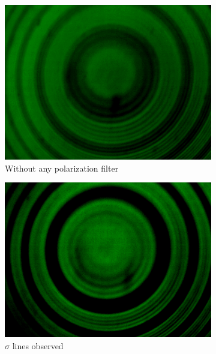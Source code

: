 \begin{figure}
    \centering
    \begin{subfigure}[b]{0.45\textwidth}
        \centering
        \includegraphics[width=\textwidth]{images/ano4.png}
        \caption{Without any polarization filter}
    \end{subfigure}
    \hfill
    \begin{subfigure}[b]{0.45\textwidth}
        \centering
        \includegraphics[width=\textwidth]{images/sigma.png}
        \caption{$\sigma$ lines observed}
    \end{subfigure}
    \hfill
    \begin{subfigure}[b]{0.45\textwidth}
        \centering

\end{subfigure}
\end{figure}
